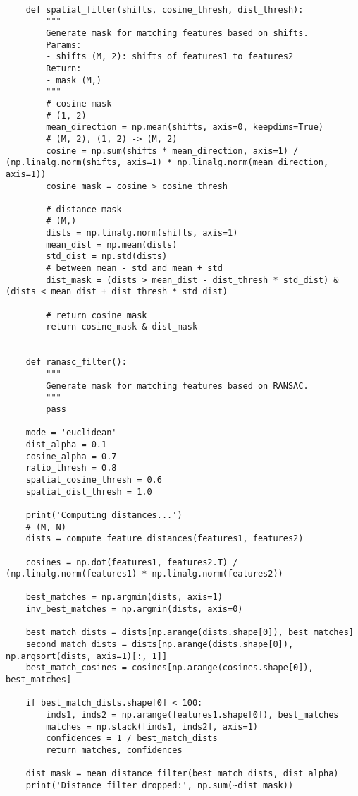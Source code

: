 \begin{lstlisting}[style=Python]
    
    def spatial_filter(shifts, cosine_thresh, dist_thresh):
        """
        Generate mask for matching features based on shifts.
        Params:
        - shifts (M, 2): shifts of features1 to features2
        Return:
        - mask (M,)
        """
        # cosine mask
        # (1, 2)
        mean_direction = np.mean(shifts, axis=0, keepdims=True)
        # (M, 2), (1, 2) -> (M, 2)
        cosine = np.sum(shifts * mean_direction, axis=1) / (np.linalg.norm(shifts, axis=1) * np.linalg.norm(mean_direction, axis=1))
        cosine_mask = cosine > cosine_thresh

        # distance mask
        # (M,)
        dists = np.linalg.norm(shifts, axis=1)
        mean_dist = np.mean(dists)
        std_dist = np.std(dists)
        # between mean - std and mean + std
        dist_mask = (dists > mean_dist - dist_thresh * std_dist) & (dists < mean_dist + dist_thresh * std_dist)

        # return cosine_mask
        return cosine_mask & dist_mask
    
    
    def ranasc_filter():
        """
        Generate mask for matching features based on RANSAC.
        """
        pass

    mode = 'euclidean'
    dist_alpha = 0.1
    cosine_alpha = 0.7
    ratio_thresh = 0.8
    spatial_cosine_thresh = 0.6
    spatial_dist_thresh = 1.0
    
    print('Computing distances...')
    # (M, N)
    dists = compute_feature_distances(features1, features2)

    cosines = np.dot(features1, features2.T) / (np.linalg.norm(features1) * np.linalg.norm(features2))
    
    best_matches = np.argmin(dists, axis=1)
    inv_best_matches = np.argmin(dists, axis=0)

    best_match_dists = dists[np.arange(dists.shape[0]), best_matches]
    second_match_dists = dists[np.arange(dists.shape[0]), np.argsort(dists, axis=1)[:, 1]]
    best_match_cosines = cosines[np.arange(cosines.shape[0]), best_matches]

    if best_match_dists.shape[0] < 100:
        inds1, inds2 = np.arange(features1.shape[0]), best_matches
        matches = np.stack([inds1, inds2], axis=1)
        confidences = 1 / best_match_dists
        return matches, confidences
    
    dist_mask = mean_distance_filter(best_match_dists, dist_alpha)
    print('Distance filter dropped:', np.sum(~dist_mask))


\end{lstlisting}
